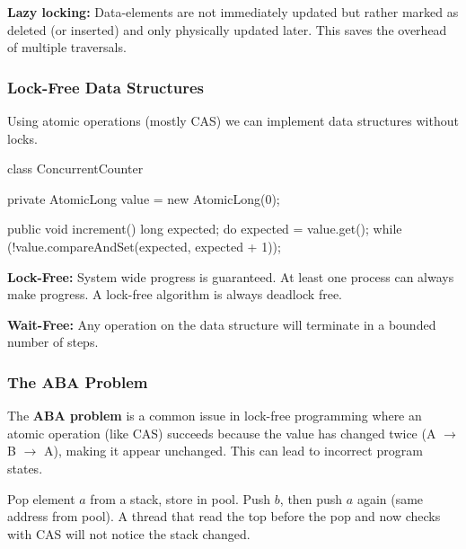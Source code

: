 \begin{definition}
\textbf{Lazy locking:} Data-elements are not immediately updated but rather marked as deleted (or inserted) and only physically updated later. This saves the overhead of multiple traversals.
\end{definition}

\subsubsection{Lock-Free Data Structures}

\begin{remark}
Using atomic operations (mostly CAS) we can implement data structures without locks.
\end{remark}

\begin{codeexample}
class ConcurrentCounter {
    private AtomicLong value = new AtomicLong(0);
    
    public void increment() {
        long expected;
        do {
            expected = value.get();
        } while (!value.compareAndSet(expected, expected + 1));
    }
}
\end{codeexample}

\begin{definition}
\textbf{Lock-Free:} System wide progress is guaranteed. At least one process can always make progress. A lock-free algorithm is always deadlock free.
\end{definition}

\begin{definition}
\textbf{Wait-Free:} Any operation on the data structure will terminate in a bounded number of steps.
\end{definition}

\subsubsection{The ABA Problem}

\begin{important}
The \textbf{ABA problem} is a common issue in lock-free programming where an atomic operation (like CAS) succeeds because the value has changed twice (A $\to$ B $\to$ A), making it appear unchanged. This can lead to incorrect program states.
\end{important}

\begin{example}
Pop element $a$ from a stack, store in pool. Push $b$, then push $a$ again (same address from pool). A thread that read the top before the pop and now checks with CAS will not notice the stack changed.
\end{example}

